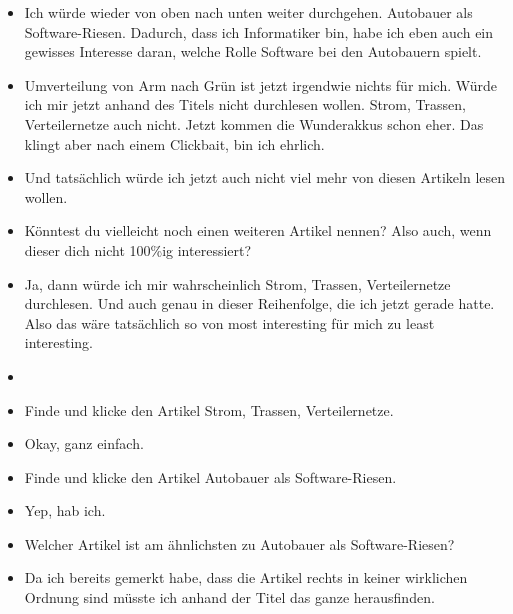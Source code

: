 {\begin{itemize}[]
                  Also \flqq Fürs Klima und gegen China\frqq{} würde ich mir durchlesen, weil ich das gut finde, wenn wir halt vielleicht nicht so abhängig sind von anderen Staaten, was E-Mobilität angeht.
            \item {} Ich würde wieder von oben nach unten weiter durchgehen.
                  \flqq Autobauer als Software-Riesen\frqq{}.
                  Dadurch, dass ich Informatiker bin, habe ich eben auch ein gewisses Interesse daran, welche Rolle Software bei den Autobauern spielt.
            \item {} \flqq Umverteilung von Arm nach Grün\frqq{} ist jetzt irgendwie nichts für mich. Würde ich mir jetzt anhand des Titels nicht durchlesen wollen.
                  \flqq Strom, Trassen, Verteilernetze\frqq{} auch nicht.
                  \flqq Jetzt kommen die Wunderakkus\frqq{} schon eher.
                  Das klingt aber nach einem Clickbait, bin ich ehrlich.
            \item {} Und tatsächlich würde ich jetzt auch nicht viel mehr von diesen Artikeln lesen wollen.
            \item {} Könntest du vielleicht noch einen weiteren Artikel nennen? Also auch, wenn dieser dich nicht 100\%ig interessiert?
            \item {} Ja, dann würde ich mir wahrscheinlich \flqq Strom, Trassen, Verteilernetze\frqq{} durchlesen.
                  Und auch genau in dieser Reihenfolge, die ich jetzt gerade hatte.
                  Also das wäre tatsächlich so von most interesting für mich zu least interesting.
            \item {}
            \item {} Finde und klicke den Artikel \flqq Strom, Trassen, Verteilernetze\frqq{}.
            \item {} Okay, ganz einfach.
            \item {} Finde und klicke den Artikel \flqq Autobauer als Software-Riesen\frqq{}.
            \item {} Yep, hab ich.
            \item {} Welcher Artikel ist am ähnlichsten zu \flqq Autobauer als Software-Riesen\frqq{}?
            \item {} Da ich bereits gemerkt habe, dass die Artikel rechts in keiner wirklichen Ordnung sind müsste ich anhand der Titel das ganze herausfinden.

\end{itemize}}
